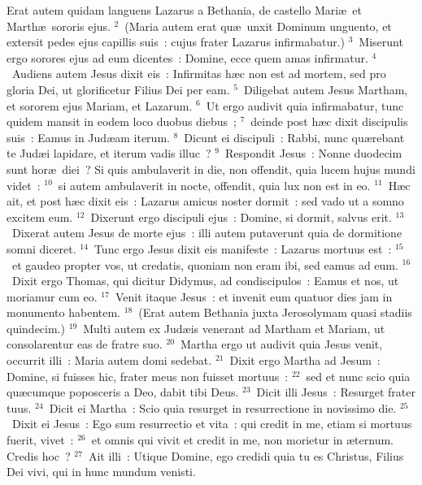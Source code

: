\lettrine[lines=3,image=true,loversize=0.05,lraise=-0.03]{E}{}rat autem quidam languens Lazarus a Bethania, de castello Mari\ae\ et Marth\ae\ sororis ejus.
${}^{2}$~(Maria autem erat qu\ae\ unxit Dominum unguento, et extersit pedes ejus capillis suis~: cujus frater Lazarus infirmabatur.)
${}^{3}$~Miserunt ergo sorores ejus ad eum dicentes~: Domine, ecce quem amas infirmatur.
${}^{4}$~Audiens autem Jesus dixit eis~: Infirmitas h\ae c non est ad mortem, sed pro gloria Dei, ut glorificetur Filius Dei per eam.
${}^{5}$~Diligebat autem Jesus Martham, et sororem ejus Mariam, et Lazarum.
${}^{6}$~Ut ergo audivit quia infirmabatur, tunc quidem mansit in eodem loco duobus diebus~;
${}^{7}$~deinde post h\ae c dixit discipulis suis~: Eamus in Jud\ae am iterum.
${}^{8}$~Dicunt ei discipuli~: Rabbi, nunc qu\ae rebant te Jud\ae i lapidare, et iterum vadis illuc~?
${}^{9}$~Respondit Jesus~: Nonne duodecim sunt hor\ae\ diei~? Si quis ambulaverit in die, non offendit, quia lucem hujus mundi videt~:
${}^{10}$~si autem ambulaverit in nocte, offendit, quia lux non est in eo.
${}^{11}$~H\ae c ait, et post h\ae c dixit eis~: Lazarus amicus noster dormit~: sed vado ut a somno excitem eum.
${}^{12}$~Dixerunt ergo discipuli ejus~: Domine, si dormit, salvus erit.
${}^{13}$~Dixerat autem Jesus de morte ejus~: illi autem putaverunt quia de dormitione somni diceret.
${}^{14}$~Tunc ergo Jesus dixit eis manifeste~: Lazarus mortuus est~:
${}^{15}$~et gaudeo propter vos, ut credatis, quoniam non eram ibi, sed eamus ad eum.
${}^{16}$~Dixit ergo Thomas, qui dicitur Didymus, ad condiscipulos~: Eamus et nos, ut moriamur cum eo.
${}^{17}$~Venit itaque Jesus~: et invenit eum quatuor dies jam in monumento habentem.
${}^{18}$~(Erat autem Bethania juxta Jerosolymam quasi stadiis quindecim.)
${}^{19}$~Multi autem ex Jud\ae is venerant ad Martham et Mariam, ut consolarentur eas de fratre suo.
${}^{20}$~Martha ergo ut audivit quia Jesus venit, occurrit illi~: Maria autem domi sedebat.
${}^{21}$~Dixit ergo Martha ad Jesum~: Domine, si fuisses hic, frater meus non fuisset mortuus~:
${}^{22}$~sed et nunc scio quia qu\ae cumque poposceris a Deo, dabit tibi Deus.
${}^{23}$~Dicit illi Jesus~: Resurget frater tuus.
${}^{24}$~Dicit ei Martha~: Scio quia resurget in resurrectione in novissimo die.
${}^{25}$~Dixit ei Jesus~: Ego sum resurrectio et vita~: qui credit in me, etiam si mortuus fuerit, vivet~:
${}^{26}$~et omnis qui vivit et credit in me, non morietur in \ae ternum. Credis hoc~?
${}^{27}$~Ait illi~: Utique Domine, ego credidi quia tu es Christus, Filius Dei vivi, qui in hunc mundum venisti.
